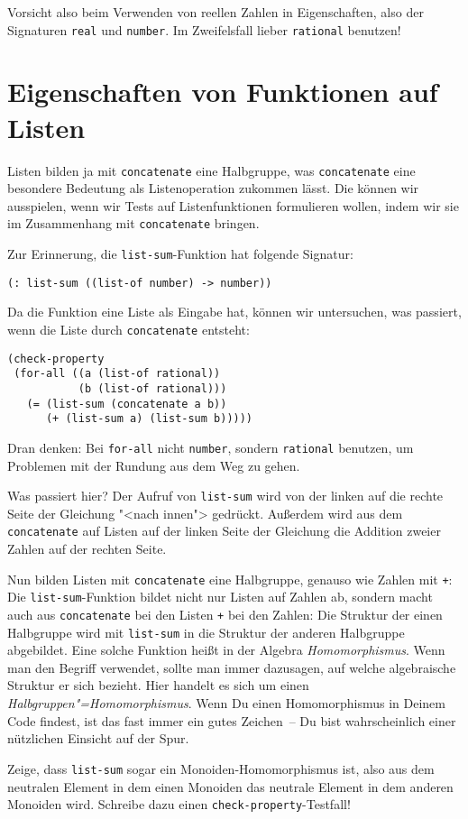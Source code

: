 Vorsicht also beim Verwenden von reellen Zahlen in Eigenschaften, also
der Signaturen \lstinline{real} und \lstinline{number}.  Im
Zweifelsfall lieber \lstinline{rational} benutzen!

\section{Eigenschaften von Funktionen auf Listen}

Listen bilden ja mit \lstinline{concatenate} eine Halbgruppe, was
\lstinline{concatenate} eine besondere Bedeutung als Listenoperation
zukommen lässt.  Die können wir ausspielen, wenn wir Tests auf
Listenfunktionen formulieren wollen, indem wir sie im Zusammenhang mit
\lstinline{concatenate} bringen.

Zur Erinnerung, die \lstinline{list-sum}-Funktion hat folgende
Signatur:
%
\begin{lstlisting}
(: list-sum ((list-of number) -> number))
\end{lstlisting}
%
Da die Funktion eine Liste als Eingabe hat, können wir untersuchen,
was passiert, wenn die Liste durch \lstinline{concatenate} entsteht:
%
\begin{lstlisting}
(check-property
 (for-all ((a (list-of rational))
           (b (list-of rational)))
   (= (list-sum (concatenate a b))
      (+ (list-sum a) (list-sum b)))))
\end{lstlisting}
%
Dran denken: Bei \lstinline{for-all} nicht \lstinline{number},
sondern \lstinline{rational} benutzen, um Problemen mit der Rundung
aus dem Weg zu gehen.

Was passiert hier?  Der Aufruf von \lstinline{list-sum} wird von der
linken auf die rechte Seite der Gleichung "<nach innen"> gedrückt.
Außerdem wird aus dem \lstinline{concatenate} auf Listen auf der
linken Seite der Gleichung die Addition zweier Zahlen auf der rechten
Seite.

Nun bilden Listen mit \lstinline{concatenate} eine Halbgruppe, genauso
wie Zahlen mit \lstinline{+}: Die \lstinline{list-sum}-Funktion bildet
nicht nur Listen auf Zahlen ab, sondern macht auch aus
\lstinline{concatenate} bei den Listen \lstinline{+} bei den Zahlen:
Die Struktur der einen Halbgruppe wird mit \lstinline{list-sum} in die
Struktur der anderen Halbgruppe abgebildet.  Eine solche Funktion heißt in
der Algebra \textit{Homomorphismus}. Wenn man
den Begriff verwendet, sollte man immer dazusagen, auf welche
algebraische Struktur er sich bezieht.  Hier handelt es sich um einen
\textit{Halbgruppen"=Homomorphismus}.  Wenn Du einen Homomorphismus in
Deinem Code findest, ist das fast immer ein gutes Zeichen~-- Du bist
wahrscheinlich einer nützlichen Einsicht auf der Spur.
%
\begin{aufgabeinline}
  Zeige, dass \lstinline{list-sum} sogar ein Monoiden-Homomorphismus
  ist, also aus dem neutralen Element in dem einen Monoiden das
  neutrale Element in dem anderen Monoiden wird.  Schreibe dazu einen
  \lstinline{check-property}-Testfall!
\end{aufgabeinline}

